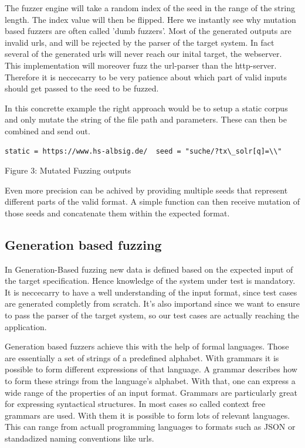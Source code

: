 \documentclass[journal=tosc,final]{iacrtrans}
\begin{document}
The fuzzer engine will take a random index of the seed in the range of the string length. The index value will then be flipped.  Here we instantly see why mutation based fuzzers are often called 'dumb fuzzers'. 
Most of the generated outputs are invalid urls, and will be rejected by the parser of the target system. In fact several of the generated urls will never reach our inital target, the webserver. This implementation will moreover fuzz the url-parser than the http-server.
Therefore it is neccecarry to be very patience about which part of valid inputs should get passed to the seed to be fuzzed. 

In this concrette example the right approach would be to setup a  static corpus and only mutate the string of the file path and parameters. 
These can then be combined and send out.
\begin{center}
\begin{shaded}
\begin{verbatim}
static = https://www.hs-albsig.de/  seed = "suche/?tx\_solr[q]=\\"
\end{verbatim}
\vspace{2mm} Figure 3: Mutated Fuzzing outputs
\end{shaded}
\end{center}
Even more precision can be achived by providing multiple seeds that represent different parts of the valid format. A simple function can then receive mutation of those seeds and concatenate them within the expected format.

\newpage
\subsection{Generation based fuzzing}
In Generation-Based fuzzing new data is defined based on the expected input of the target specification. Hence knowledge of the system under test is mandatory. It is neccecarry to have a well understanding of the input format, since test cases are generated completly from scratch. It's also importand since we want to ensure to pass the parser of the target system, so our test cases are actually reaching the application.

Generation based fuzzers achieve this with the help of formal languages. Those are essentially a set of strings of a predefined alphabet. With grammars it is possible to form different expressions of that language. A grammar describes how to form these strings from the language's alphabet. With that, one can express a wide range of the properties of an input format. Grammars are particularly great for expressing syntactical structures. In most cases so called context free grammars are used. With them it is possible to form lots of relevant languages. This can range from actuall programming languages to formats such as JSON or standadized naming conventions like urls.
\end{document}
